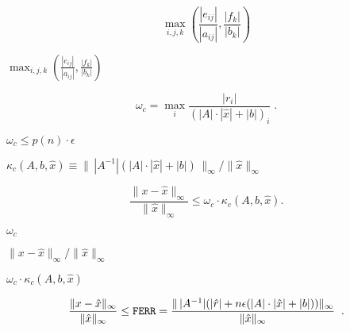{\newpage\clearpage
{}%
\begin{displaymath}
\max_{i,j,k} \left( \frac{| e_{ij} |}{|a_{ij}|} ,
            \frac{| f_{k} |}{|b_{k}|} \right)
\end{displaymath}%
\lthtmldisplayZ
\lthtmlcheckvsize\clearpage}

{\newpage\clearpage
{}%
$\max_{i,j,k} \left( \frac{| e_{ij} |}{|a_{ij}|} ,
\frac{| f_{k} |}{|b_{k}|} \right)$%
\lthtmlinlinemathZ
\lthtmlcheckvsize\clearpage}

{\newpage\clearpage
{}%
\begin{displaymath}
\omega_{c}= \max_i \frac{|r_i|}{ (|A| \cdot |\hat{x} | + |b|)_i} \; .
\end{displaymath}%
\lthtmldisplayZ
\lthtmlcheckvsize\clearpage}

{\newpage\clearpage
{}%
$\omega_{c}\leq p(n) \cdot \epsilon$%
\lthtmlinlinemathZ
\lthtmlcheckvsize\clearpage}

{\newpage\clearpage
{}%
$\kappa_{c}(A,b,\hat{x}) \equiv {\| \, |A^{-1}| ( |A| \cdot | \hat{x} | + |b| )
\, \|_{\infty}}/{\| \hat{x} \|_{\infty}}$%
\lthtmlinlinemathZ
\lthtmlcheckvsize\clearpage}

{\newpage\clearpage
{}%
\begin{displaymath}
\frac{\| x- \hat{x} \|_{\infty}}{\| \hat{x} \|_{\infty}}
\leq \omega_{c}\cdot \kappa_{c}(A,b,\hat{x})  .
\end{displaymath}%
\lthtmldisplayZ
\lthtmlcheckvsize\clearpage}

{\newpage\clearpage
{}%
$\omega_{c}$%
\lthtmlinlinemathZ
\lthtmlcheckvsize\clearpage}

{\newpage\clearpage
{}%
$\|x - \hat{x}\|_{\infty}/ \| \hat{x} \|_{\infty}$%
\lthtmlinlinemathZ
\lthtmlcheckvsize\clearpage}

{\newpage\clearpage
{}%
$\omega_{c}\cdot \kappa_{c}(A,b,\hat{x})$%
\lthtmlinlinemathZ
\lthtmlcheckvsize\clearpage}

{\newpage\clearpage
{}%
\begin{displaymath}
\frac{\| x- \hat{x} \|_{\infty}}{\| \hat{x} \|_{\infty}} \leq {\tt FERR} =
\frac{\| \, |A^{-1}| ( |\hat{r}| + n \epsilon (|A| \cdot |\hat{x}| + |b|) )
\|_{\infty}} {\| \hat{x} \|_{\infty}}  \; \; .
\end{displaymath}%
\lthtmldisplayZ
\lthtmlcheckvsize\clearpage}

